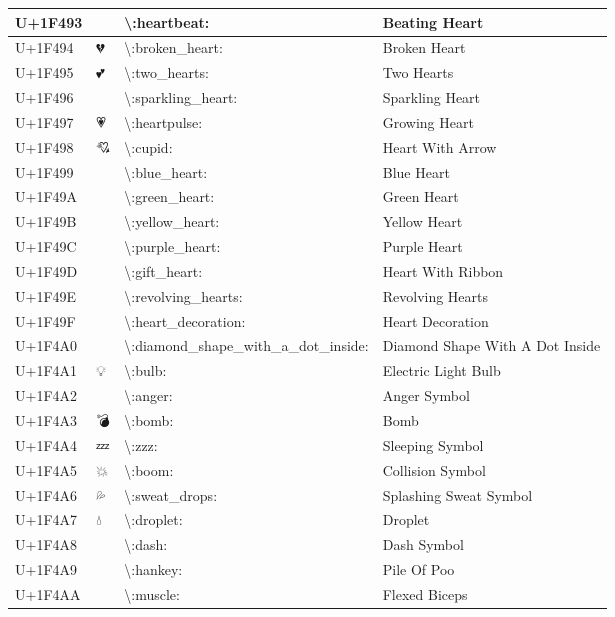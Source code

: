 \begin{table}[h]
\begin{tabulary}{\linewidth}{|L|L|L|L|}
U+1F493 & 💓 & {\textbackslash}:heartbeat: & Beating Heart \\
\hline
U+1F494 & 💔 & {\textbackslash}:broken\_heart: & Broken Heart \\
\hline
U+1F495 & 💕 & {\textbackslash}:two\_hearts: & Two Hearts \\
\hline
U+1F496 & 💖 & {\textbackslash}:sparkling\_heart: & Sparkling Heart \\
\hline
U+1F497 & 💗 & {\textbackslash}:heartpulse: & Growing Heart \\
\hline
U+1F498 & 💘 & {\textbackslash}:cupid: & Heart With Arrow \\
\hline
U+1F499 & 💙 & {\textbackslash}:blue\_heart: & Blue Heart \\
\hline
U+1F49A & 💚 & {\textbackslash}:green\_heart: & Green Heart \\
\hline
U+1F49B & 💛 & {\textbackslash}:yellow\_heart: & Yellow Heart \\
\hline
U+1F49C & 💜 & {\textbackslash}:purple\_heart: & Purple Heart \\
\hline
U+1F49D & 💝 & {\textbackslash}:gift\_heart: & Heart With Ribbon \\
\hline
U+1F49E & 💞 & {\textbackslash}:revolving\_hearts: & Revolving Hearts \\
\hline
U+1F49F & 💟 & {\textbackslash}:heart\_decoration: & Heart Decoration \\
\hline
U+1F4A0 & 💠 & {\textbackslash}:diamond\_shape\_with\_a\_dot\_inside: & Diamond Shape With A Dot Inside \\
\hline
U+1F4A1 & 💡 & {\textbackslash}:bulb: & Electric Light Bulb \\
\hline
U+1F4A2 & 💢 & {\textbackslash}:anger: & Anger Symbol \\
\hline
U+1F4A3 & 💣 & {\textbackslash}:bomb: & Bomb \\
\hline
U+1F4A4 & 💤 & {\textbackslash}:zzz: & Sleeping Symbol \\
\hline
U+1F4A5 & 💥 & {\textbackslash}:boom: & Collision Symbol \\
\hline
U+1F4A6 & 💦 & {\textbackslash}:sweat\_drops: & Splashing Sweat Symbol \\
\hline
U+1F4A7 & 💧 & {\textbackslash}:droplet: & Droplet \\
\hline
U+1F4A8 & 💨 & {\textbackslash}:dash: & Dash Symbol \\
\hline
U+1F4A9 & 💩 & {\textbackslash}:hankey: & Pile Of Poo \\
\hline
U+1F4AA & 💪 & {\textbackslash}:muscle: & Flexed Biceps \\

\end{tabulary}
\end{table}
